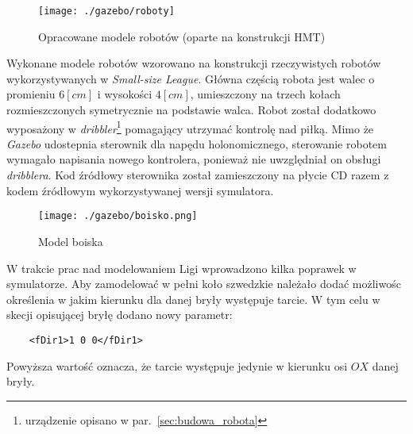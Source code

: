 	\begin{figure}[!b]
	\centering
	\texttt{[image: ./gazebo/roboty]}
	\caption{Opracowane modele robotów (oparte na konstrukcji HMT)}
	\end{figure}

	Wykonane modele robotów wzorowano na konstrukcji rzeczywistych robotów wykorzystywanych w \emph{Small-size League}.
	Główna częścią robota jest walec o promieniu $6[cm]$ i wysokości $4[cm]$, umieszczony na trzech kołach rozmieszczonych symetrycznie na podstawie walca.
	Robot został dodatkowo wyposażony w \textit{dribbler}\protect\footnote{urządzenie opisano w par.~\ref{sec:budowa_robota}} pomagający utrzymać kontrolę nad piłką.
	Mimo że \textit{Gazebo} udostepnia sterownik dla napędu holonomicznego, sterowanie robotem wymagało napisania nowego kontrolera, ponieważ nie uwzględniał on obsługi
	\textit{dribblera}. Kod źródłowy sterownika został zamieszczony na płycie CD razem z kodem źródłowym wykorzystywanej wersji symulatora.	
	\begin{figure}[H]
	\centering
	\texttt{[image: ./gazebo/boisko.png]}
	\caption{Model boiska}
	\end{figure}

	W trakcie prac nad modelowaniem Ligi wprowadzono kilka poprawek w symulatorze. Aby zamodelować w pełni koło szwedzkie należało dodać możliwośc określenia
	w jakim kierunku dla danej bryły występuje tarcie. W tym celu w skecji opisującej bryłę dodano nowy parametr:
	\begin{lstlisting}	
	<fDir1>1 0 0</fDir1>
	\end{lstlisting}
	Powyższa wartość oznacza, że tarcie występuje jedynie w kierunku osi $OX$ danej bryły.
